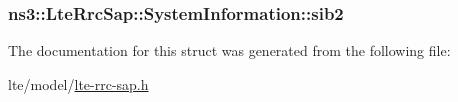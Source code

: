 \subsubsection[{\texorpdfstring{sib2}{sib2}}]{ ns3\+::\+Lte\+Rrc\+Sap\+::\+System\+Information\+::sib2}\hypertarget{structns3_1_1LteRrcSap_1_1SystemInformation_af016b1a6316f1fbec78ccbeb3160207c}{}\label{structns3_1_1LteRrcSap_1_1SystemInformation_af016b1a6316f1fbec78ccbeb3160207c}


The documentation for this struct was generated from the following file\+:\begin{DoxyCompactItemize}
\item 
lte/model/\hyperlink{lte-rrc-sap_8h}{lte-\/rrc-\/sap.\+h}\end{DoxyCompactItemize}
